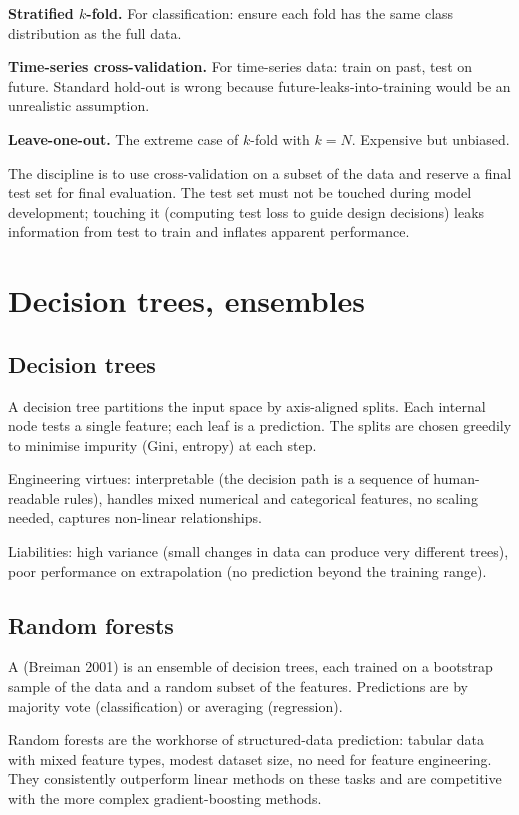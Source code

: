 \textbf{Stratified $k$-fold.} For classification: ensure each fold has the same class distribution as the full data.

\textbf{Time-series cross-validation.} For time-series data: train on past, test on future. Standard hold-out is wrong because future-leaks-into-training would be an unrealistic assumption.

\textbf{Leave-one-out.} The extreme case of $k$-fold with $k = N$. Expensive but unbiased.

The discipline is to use cross-validation on a subset of the data and reserve a final test set for final evaluation. The test set must not be touched during model development; touching it (computing test loss to guide design decisions) leaks information from test to train and inflates apparent performance.

\section{Decision trees, ensembles}

\subsection{Decision trees}

A decision tree partitions the input space by axis-aligned splits. Each internal node tests a single feature; each leaf is a prediction. The splits are chosen greedily to minimise impurity (Gini, entropy) at each step.

Engineering virtues: interpretable (the decision path is a sequence of human-readable rules), handles mixed numerical and categorical features, no scaling needed, captures non-linear relationships.

Liabilities: high variance (small changes in data can produce very different trees), poor performance on extrapolation (no prediction beyond the training range).

\subsection{Random forests}

A  (Breiman 2001) is an ensemble of decision trees, each trained on a bootstrap sample of the data and a random subset of the features. Predictions are by majority vote (classification) or averaging (regression).

Random forests are the workhorse of structured-data prediction: tabular data with mixed feature types, modest dataset size, no need for feature engineering. They consistently outperform linear methods on these tasks and are competitive with the more complex gradient-boosting methods.

